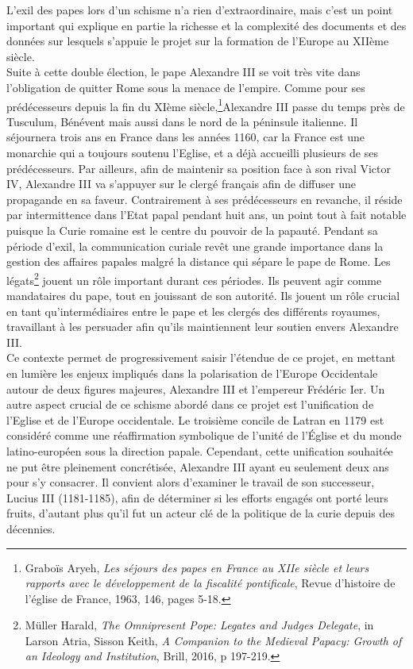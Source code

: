 L’exil des papes lors d’un schisme n’a rien d’extraordinaire, mais c’est un point important qui explique en partie la richesse et la complexité des documents et des données sur lesquels s’appuie le projet sur la formation de l’Europe au XIIème siècle. \\
Suite à cette double élection, le pape Alexandre III se voit très vite dans l’obligation de quitter Rome sous la menace de l’empire. Comme pour ses prédécesseurs depuis la fin du XIème siècle,\footnote{Graboïs Aryeh, \textit{Les séjours des papes en France au XIIe siècle et leurs rapports avec le développement de la fiscalité pontificale}, Revue d’histoire de l’église de France, 1963, 146, pages 5-18.}Alexandre III passe du temps près de Tusculum, Bénévent mais aussi dans le nord de la péninsule italienne. Il séjournera trois ans en France dans les années 1160, car la France est une monarchie qui a toujours soutenu l’Eglise, et a déjà accueilli plusieurs de ses prédécesseurs. Par ailleurs, afin de maintenir sa position face à son rival Victor IV, Alexandre III va s’appuyer sur le clergé français afin de diffuser une propagande en sa faveur. Contrairement à ses prédécesseurs en revanche, il réside par intermittence dans l’Etat papal pendant huit ans, un point tout à fait notable puisque la Curie romaine est le centre du pouvoir de la papauté.
Pendant sa période d’exil, la communication curiale revêt une grande importance dans la gestion des affaires papales malgré la distance qui sépare le pape de Rome. Les légats\footnote{Müller Harald, \textit{The Omnipresent Pope: Legates and Judges Delegate}, in Larson Atria, Sisson Keith, \textit{A Companion to the Medieval Papacy: Growth of an Ideology and Institution}, Brill, 2016, p 197-219.} jouent un rôle important durant ces périodes. Ils peuvent agir comme mandataires du pape, tout en jouissant de son autorité. Ils jouent un rôle crucial en tant qu'intermédiaires entre le pape et les clergés des différents royaumes, travaillant à les persuader afin qu’ils maintiennent leur soutien envers Alexandre III.\\

Ce contexte permet de progressivement saisir l'étendue de ce projet, en mettant en lumière les enjeux impliqués dans la polarisation de l'Europe Occidentale autour de deux figures majeures, Alexandre III et l'empereur Frédéric Ier. Un autre aspect crucial de ce schisme abordé dans ce projet est l’unification de l’Eglise et de l’Europe occidentale. Le troisième concile de Latran en 1179 est considéré comme une réaffirmation symbolique de l'unité de l'Église et du monde latino-européen sous la direction papale. Cependant, cette unification souhaitée ne put être pleinement concrétisée, Alexandre III ayant eu seulement deux ans pour s’y consacrer. Il convient alors d'examiner le travail de son successeur, Lucius III (1181-1185), afin de déterminer si  les efforts engagés ont porté leurs fruits, d'autant plus qu'il fut un acteur clé de la politique de la curie depuis des décennies.


